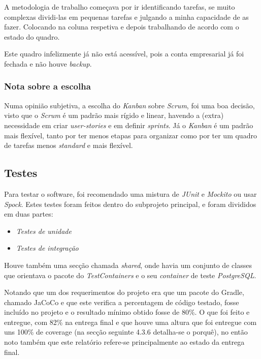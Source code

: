 A metodologia de trabalho começava por ir identificando tarefas, se muito complexas dividi-las em pequenas tarefas e julgando a minha capacidade de as fazer. Colocando na coluna respetiva e depois trabalhando de acordo com o estado do quadro.

Este quadro infelizmente já não está acessível, pois a conta empresarial já foi fechada e não houve \textit{backup}.

\subsubsection{Nota sobre a escolha}

Numa opinião subjetiva, a escolha do \textit{Kanban} sobre \textit{Scrum}, foi uma boa decisão, visto que o \textit{Scrum} é um padrão mais rígido e linear, havendo a (extra) necessidade em criar \textit{user-stories} e em definir \textit{sprints}. Já o \textit{Kanban} é um padrão mais flexível, tanto por ter menos etapas para organizar como por ter um quadro de tarefas menos \textit{standard} e mais flexível.

\subsection{Testes}

Para testar o software, foi recomendado uma mistura de \textit{JUnit} e \textit{Mockito} ou usar \textit{Spock}. Estes testes foram feitos dentro do subprojeto principal, e foram divididos em duas partes:

\begin{itemize}
  \item \textit{Testes de unidade}
  \item \textit{Testes de integração}
\end{itemize}

Houve também uma secção chamada \textit{shared}, onde havia um conjunto de classes que orientava o pacote do \textit{TestContainers} e o seu \textit{container} de teste \textit{PostgreSQL}.

Notando que um dos requerimentos do projeto era que um pacote do Gradle, chamado JaCoCo e que este verifica a percentagem de código testado, fosse incluído no projeto e o resultado mínimo obtido fosse de 80\%. O que foi feito e entregue, com 82\% na entrega final e que houve uma altura que foi entregue com uns 100\% de coverage (na secção seguinte 4.3.6 detalha-se o porquê), no então noto também que este relatório refere-se principalmente ao estado da entrega final.

